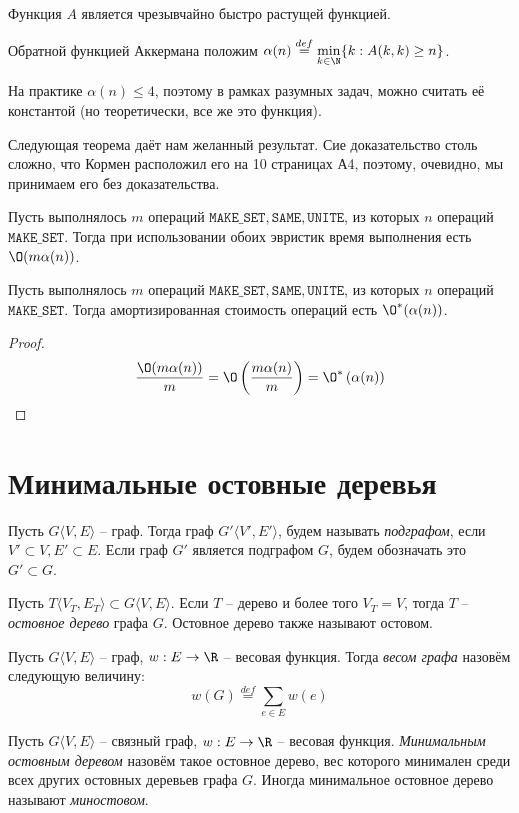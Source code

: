 Функция $A$ является чрезывчайно быстро растущей функцией.

\Def Обратной функцией Аккермана положим $\alpha(n) \overset{def}{=} \min\limits_{k \in \N} \{ k: A(k, k) \geq n  \}$.

На практике $\alpha(n) \leq 4$, поэтому в рамках разумных задач, можно считать её константой (но теоретически, все же это функция).

Следующая теорема даёт нам желанный результат. Сие доказательство столь сложно, что Кормен расположил его на 10 страницах А4, поэтому, очевидно, мы принимаем его без доказательства.

\ThBd Пусть выполнялось $m$ операций $\texttt{MAKE\_SET}, \texttt{SAME}, \texttt{UNITE}$, из которых $n$ операций $\texttt{MAKE\_SET}$. 
Тогда при использовании обоих эвристик время выполнения есть $\O(m \alpha(n))$.

\ConsBd Пусть выполнялось $m$ операций $\texttt{MAKE\_SET}, \texttt{SAME}, \texttt{UNITE}$, из которых $n$ операций $\texttt{MAKE\_SET}$. Тогда амортизированная стоимость операций есть $\O^*(\alpha(n))$.
\begin{proof}
    \begin{equation*}
        \frac{\O(m \alpha(n))}{m} = \O\left(\frac{m \alpha(n)}{m}\right) = \O^*\left(\alpha(n)\right)
    \end{equation*}
\end{proof}

\section{Минимальные остовные деревья}

\Def Пусть $G \langle V, E \rangle$ -- граф. Тогда граф $G' \langle V', E' \rangle$, будем называть \textit{подграфом}, если $V' \subset V, E' \subset E$. Если граф $G'$ является подграфом $G$, будем обозначать это $G' \subset G$.

\Def Пусть $T\langle V_T, E_T \rangle \subset G\langle V, E \rangle$. Если $T$ -- дерево и более того $V_T = V$, тогда $T$ -- \textit{остовное дерево} графа $G$. Остовное дерево также называют остовом.

\Def Пусть $G \langle V, E \rangle$ -- граф, $w: E \to \R$ -- весовая функция. Тогда \textit{весом графа} назовём следующую величину:
\begin{equation*}
    w(G) \overset{def}{=} \sum\limits_{e \in E} w(e)
\end{equation*}

\Def Пусть $G \langle V, E \rangle$ -- связный граф, $w: E \to \R$ -- весовая функция. \textit{Минимальным остовным деревом} назовём такое остовное дерево, вес которого минимален среди всех других остовных деревьев графа $G$. Иногда минимальное остовное дерево называют \textit{миностовом}.


